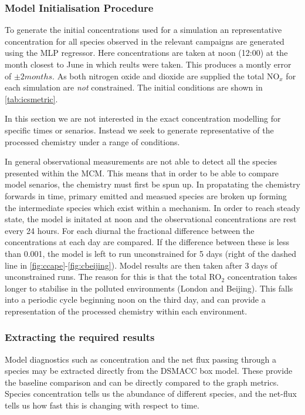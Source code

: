 \subsubsection{Model Initialisation Procedure}

To generate the initial concentrations used for a simulation an representative concentration for all species observed in the relevant campaigns are generated using the MLP regressor. Here concentrations are taken at noon (12:00) at the month closest to June in which reults were taken. This produces a montly error of $\pm 2 months$. As both nitrogen oxide and dioxide are supplied the total NO$_x$ for each simulation are \emph{not} constrained. The initial conditions are shown in \autoref{tab:icsmetric}.

In this section we are not interested in the exact concentration modelling for specific times or senarios. Instead we seek to generate representative of the processed chemistry under a range of conditions. 

In general observational measurements are not able to detect all the species presented within the MCM. This means that in order to be able to compare model senarios, the chemistry must first be spun up. In propatating the chemistry forwards in time, primary emitted and measued species are broken up forming the intermediate species which exist within a mechanism. In order to reach steady state, the model is initated at noon and the observational concentrations are rest every 24 hours. For each diurnal the fractional difference between the concentrations at each day are compared. If the difference between these is less than 0.001, the model is left to run unconstrained for 5 days (right of the dashed line in \autoref{fig:ccape}-\ref{fig:cbeijing}). Model results are then taken after 3 days of unconstrained runs. The reason for this is that the total RO$_2$ concentration takes longer to stabilise in the polluted environments (London and Beijing). This falls into a periodic cycle beginning noon on the third day, and can provide a representation of the processed chemistry within each environment. 

\subsubsection{Extracting the required results}
Model diagnostics such as concentration and the net flux passing through a species may be extracted directly from the DSMACC box model. These provide the baseline comparison and can be directly compared to the graph metrics. Species concentration tells us the abundance of different species, and the net-flux tells us how fast this is changing with respect to time. 

